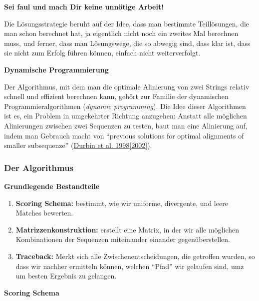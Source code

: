 \par\noindent\textbf{Sei faul und mach Dir keine unnötige Arbeit!}

Die Lösungsstrategie beruht auf der Idee, dass man bestimmte
Teillösungen, die man schon berechnet hat, ja eigentlich nicht noch ein
zweites Mal berechnen muss, und ferner, dass man Lösungswege, die so
abwegig sind, dass klar ist, dass sie nicht zum Erfolg führen können,
einfach nicht weiterverfolgt.




\par\noindent\textbf{Dynamische Programmierung}

Der Algorithmus, mit dem man die optimale Alinierung von zwei Strings
relativ schnell und effizient berechnen kann, gehört zur Familie der
dynamischen Programmieralgorithmen (\emph{dynamic programming}). Die
Idee dieser Algorithmen ist es, ein Problem in umgekehrter Richtung
anzugehen: Anstatt alle möglichen Alinierungen zwischen zwei Sequenzen
zu testen, baut man eine Alinierung auf, indem man Gebrauch macht von
``previous solutions for optimal alignments of smaller subsequenze''
(\href{http://bibliography.lingpy.org?key=Durbin2002}{Durbin et al.
1998{[}2002{]}}).



\subsubsection{Der Algorithmus}

\par\noindent\textbf{Grundlegende Bestandteile}

\begin{enumerate}
\itemsep1pt\parskip0pt
\item
  \textbf{Scoring Schema:} bestimmt, wie wir uniforme, divergente, und
  leere Matches bewerten.
\item
  \textbf{Matrizzenkonstruktion:} erstellt eine Matrix, in der wir alle
  möglichen Kombinationen der Sequenzen miteinander einander
  gegenüberstellen.
\item
  \textbf{Traceback:} Merkt sich alle Zwischenentscheidungen, die
  getroffen wurden, so dass wir nachher ermitteln können, welchen
  ``Pfad'' wir gelaufen sind, umz um besten Ergebnis zu gelangen.
\end{enumerate}





\par\noindent\textbf{Scoring Schema}

